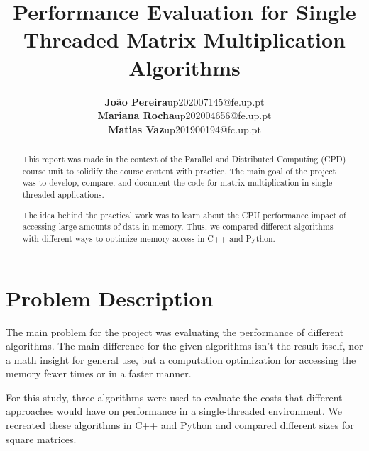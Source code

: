 \documentclass[sigconf,balance,nonacm]{acmart}
\begin{document}
\title{Performance Evaluation for Single Threaded Matrix Multiplication Algorithms}

\author{\begin{tabular}{rl}
        \textbf{João Pereira}  & up202007145@fe.up.pt \\
        \textbf{Mariana Rocha} & up202004656@fe.up.pt \\
        \textbf{Matias Vaz}    & up201900194@fc.up.pt
    \end{tabular}}


\begin{abstract}

    This report was made in the context of the Parallel and Distributed Computing (CPD) course unit to solidify the course content with practice. The main goal of the project was to develop, compare, and document the code for matrix multiplication in single-threaded applications.

    The idea behind the practical work was to learn about the CPU performance impact of accessing large amounts of data in memory. Thus, we compared different algorithms with different ways to optimize memory access in C++ and Python.

\end{abstract}

\maketitle

\section{Problem Description}

The main problem for the project was evaluating the performance of different algorithms. The main difference for the given algorithms isn't the result itself, nor a math insight for general use, but a computation optimization for accessing the memory fewer times or in a faster manner.

For this study, three algorithms were used to evaluate the costs that different approaches would have on performance in a single-threaded environment. We recreated these algorithms in C++ and Python and compared different sizes for square matrices.
\end{document}
